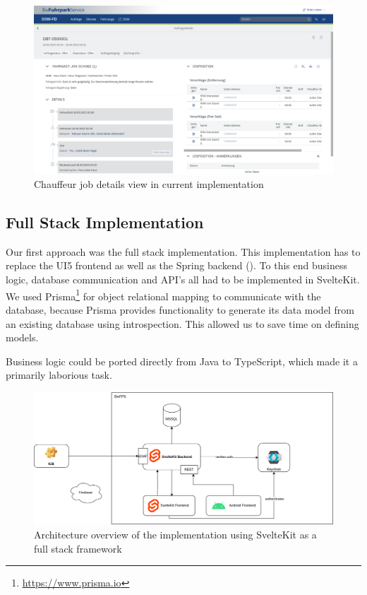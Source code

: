 \begin{figure}
    \centering
    \includegraphics[width=\linewidth]{assets/current-auftrag-details}
    \caption{Chauffeur job details view in current implementation}
    \label{fig:current-details-auftrag}
\end{figure}


\subsection{Full Stack Implementation}
Our first approach was the full stack implementation. This implementation has to replace the UI5 frontend as well as the Spring backend (). To this end business logic, database communication and API's all had to be implemented in SvelteKit. We used Prisma\footnote{\url{https://www.prisma.io}} for object relational mapping to communicate with the database, because Prisma provides functionality to generate its data model from an existing database using introspection. This allowed us to save time on defining models. 

Business logic could be ported directly from Java to TypeScript, which made it a primarily laborious task. 


\begin{figure}
    \centering
    \includegraphics[width=.8\linewidth]{assets/dswfd-architecture-fullstack}
    \caption{Architecture overview of the implementation using SvelteKit as a full stack framework}
    \label{fig:dswfd-architecture-fullstack}
\end{figure}

